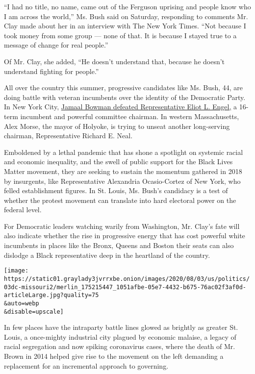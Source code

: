 ``I had no title, no name, came out of the Ferguson uprising and people
know who I am across the world,'' Ms. Bush said on Saturday, responding
to comments Mr. Clay made about her in an interview with The New York
Times. ``Not because I took money from some group --- none of that. It
is because I stayed true to a message of change for real people.''

Of Mr. Clay, she added, ``He doesn't understand that, because he doesn't
understand fighting for people.''

All over the country this summer, progressive candidates like Ms. Bush,
44, are doing battle with veteran incumbents over the identity of the
Democratic Party. In New York City,
\href{https://www.nytimes3xbfgragh.onion/2020/07/17/nyregion/jamaal-bowman-eliot-engel.html}{Jamaal
Bowman defeated Representative Eliot L. Engel,} a 16-term incumbent and
powerful committee chairman. In western Massachusetts, Alex Morse, the
mayor of Holyoke, is trying to unseat another long-serving chairman,
Representative Richard E. Neal.

Emboldened by a lethal pandemic that has shone a spotlight on systemic
racial and economic inequality, and the swell of public support for the
Black Lives Matter movement, they are seeking to sustain the momentum
gathered in 2018 by insurgents, like Representative Alexandria
Ocasio-Cortez of New York, who felled establishment figures. In St.
Louis, Ms. Bush's candidacy is a test of whether the protest movement
can translate into hard electoral power on the federal level.

For Democratic leaders watching warily from Washington, Mr. Clay's fate
will also indicate whether the rise in progressive energy that has cost
powerful white incumbents in places like the Bronx, Queens and Boston
their seats can also dislodge a Black representative deep in the
heartland of the country.

\texttt{[image: https://static01.graylady3jvrrxbe.onion/images/2020/08/03/us/politics/03dc-missouri2/merlin\_175215447\_1051afbe-05e7-4432-b675-76ac02f3af0d-articleLarge.jpg?quality=75\\\&auto=webp\\\&disable=upscale]}

In few places have the intraparty battle lines glowed as brightly as
greater St. Louis, a once-mighty industrial city plagued by economic
malaise, a legacy of racial segregation and now spiking coronavirus
cases, where the death of Mr. Brown in 2014 helped give rise to the
movement on the left demanding a replacement for an incremental approach
to governing.

